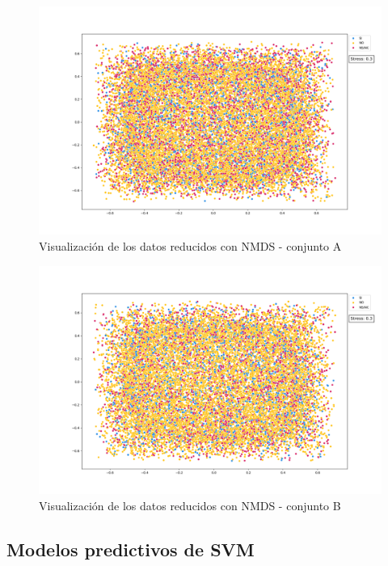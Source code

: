 \documentclass[10 pt]{article}
\begin{document}
\begin{figure}[H]
    \begin{center}
    \includegraphics[scale=.4]{images/nmds_a.png}
    \caption{Visualización de los datos reducidos con NMDS - conjunto A}
    \label{nmds_a}
    \end{center}
    \end{figure}


\begin{figure}[H]
    \begin{center}
    \includegraphics[scale=.4]{images/nmds_b.png}
    \caption{Visualización de los datos reducidos con NMDS - conjunto B}
    \label{nmds_b}
    \end{center}
    \end{figure}    

\subsection{Modelos predictivos de SVM}
\end{document}
